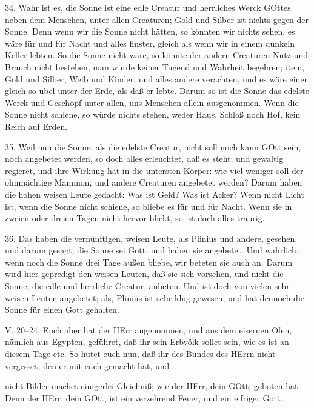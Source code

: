 34. Wahr ist es, die Sonne ist eine edle Creatur und herrliches Werck GOttes neben dem Menschen, unter allen Creaturen; Gold und Silber ist nichts gegen der Sonne. Denn wenn wir die Sonne nicht hätten, so könnten wir nichts sehen, es wäre für und für Nacht und alles finster, gleich als wenn wir in einem dunkeln Keller lebten. So die Sonne nicht wäre, so könnte der andern Creaturen Nutz und Brauch nicht bestehen, man würde keiner Tugend und Wahrheit begehren; item, Gold und Silber, Weib und Kinder, und alles andere verachten, und es wäre einer gleich so übel unter der Erde, als daß er lebte. Darum so ist die Sonne das edelste Werck und Geschöpf unter allen, uns Menschen allein ausgenommen. Wenn die Sonne nicht schiene, so würde nichts stehen, weder Haus, Schloß noch Hof, kein Reich auf Erden.

35. Weil nun die Sonne, als die edelste Creatur, nicht soll noch kann GOtt sein, noch angebetet werden, so doch alles erleuchtet, daß es steht; und gewaltig regieret, und ihre Wirkung hat in die untersten Körper: wie viel weniger soll der ohnmächtige Mammon, und andere Creaturen angebetet werden? Darum haben die hohen weisen Leute gedacht: Was ist Geld? Was ist Acker? Wenn nicht Licht ist, wenn die Sonne nicht schiene, so bliebe es für und für Nacht. Wenn sie in zweien oder dreien Tagen nicht hervor blickt, so ist doch alles traurig.

36. Das haben die vernünftigen, weisen Leute, als Plinius und andere, gesehen, und darum gesagt, die Sonne sei Gott, und haben sie angebetet. Und wahrlich, wenn noch die Sonne drei Tage außen bliebe, wir beteten sie auch an. Darum wird hier gepredigt den weisen Leuten, daß sie sich vorsehen, und nicht die Sonne, die edle und herrliche Creatur, anbeten. Und ist doch von vielen sehr weisen Leuten angebetet; als, Plinius ist sehr klug gewesen, und hat dennoch die Sonne für einen Gott gehalten.

\begin{schriftzitat}
V. 20–24. Euch aber hat der HErr angenommen, und aus dem eisernen Ofen, nämlich aus Egypten, geführet, daß ihr sein Erbvölk sollet sein, wie es ist an diesem Tage etc. So hütet euch nun, daß ihr des Bundes des HErrn nicht vergesset, den er mit euch gemacht hat, und
\end{schriftzitat}

nicht Bilder machet einigerlei Gleichniß; wie der HErr, dein GOtt, geboten hat. Denn der HErr, dein GOtt, ist ein verzehrend Feuer, und ein eifriger Gott.

